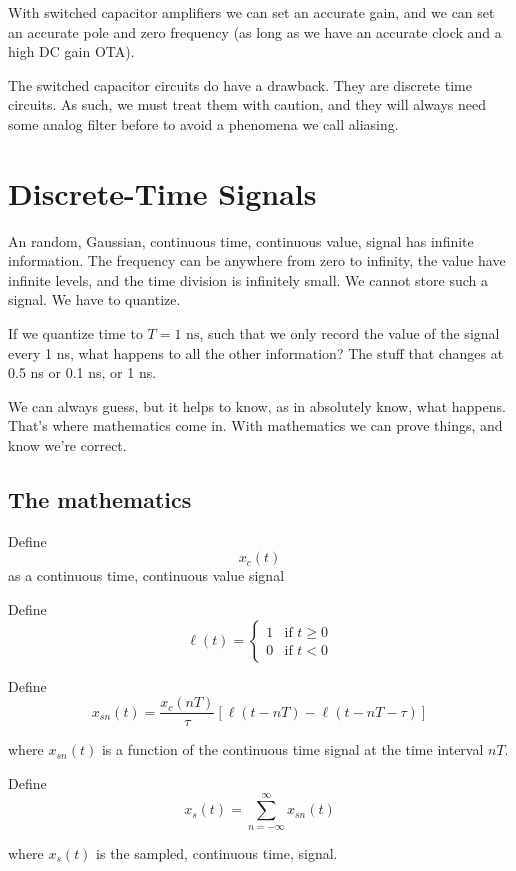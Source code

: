 With switched capacitor amplifiers we can set an accurate gain, and we
can set an accurate pole and zero frequency (as long as we have an
accurate clock and a high DC gain OTA).

The switched capacitor circuits do have a drawback. They are discrete
time circuits. As such, we must treat them with caution, and they will
always need some analog filter before to avoid a phenomena we call
aliasing.

\section{Discrete-Time Signals}\label{discrete-time-signals}

An random, Gaussian, continuous time, continuous value, signal has
infinite information. The frequency can be anywhere from zero to
infinity, the value have infinite levels, and the time division is
infinitely small. We cannot store such a signal. We have to quantize.

If we quantize time to \(T = 1\text{ ns}\), such that we only record the
value of the signal every 1 ns, what happens to all the other
information? The stuff that changes at 0.5 ns or 0.1 ns, or 1 ns.

We can always guess, but it helps to know, as in absolutely know, what
happens. That's where mathematics come in. With mathematics we can prove
things, and know we're correct.

\subsection{The mathematics}\label{the-mathematics}

Define \[ x_c (t)\] as a continuous time, continuous value signal

Define \[ 
\ell(t) = \begin{cases}
1 & \text{if } t \geq 0 \\
0 & \text{if } t < 0
\end{cases}
\]

Define
\[ x_{sn}(t) = \frac{x_c(nT)}{\tau}[\ell(t-nT) - \ell(t - nT - \tau)]\]

where \(x_{sn}(t)\) is a function of the continuous time signal at the
time interval \(nT\).

Define \[ x_s(t) = \sum_{n=-\infty}^{\infty}{x_{sn}(t)}\]

where \(x_s(t)\) is the sampled, continuous time, signal.

